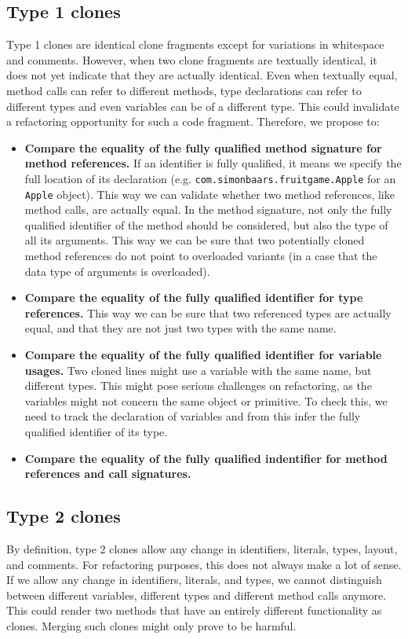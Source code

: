\documentclass[a4paper]{article}
\begin{document}
\subsection{Type 1 clones} \label{chap:type1clones}
Type 1 clones are identical clone fragments except for variations in whitespace and comments. However, when two clone fragments are textually identical, it does not yet indicate that they are actually identical. Even when textually equal, method calls can refer to different methods, type declarations can refer to different types and even variables can be of a different type. This could invalidate a refactoring opportunity for such a code fragment. Therefore, we propose to:
\begin{itemize}
  \item \textbf{Compare the equality of the fully qualified method signature for method references.} If an identifier is fully qualified, it means we specify the full location of its declaration (e.g. \texttt{com.simonbaars.fruitgame.Apple} for an \texttt{Apple} object). This way we can validate whether two method references, like method calls, are actually equal. In the method signature, not only the fully qualified identifier of the method should be considered, but also the type of all its arguments. This way we can be sure that two potentially cloned method references do not point to overloaded variants (in a case that the data type of arguments is overloaded).
  \item \textbf{Compare the equality of the fully qualified identifier for type references.} This way we can be sure that two referenced types are actually equal, and that they are not just two types with the same name.
  \item \textbf{Compare the equality of the fully qualified identifier for variable usages.} Two cloned lines might use a variable with the same name, but different types. This might pose serious challenges on refactoring, as the variables might not concern the same object or primitive. To check this, we need to track the declaration of variables and from this infer the fully qualified identifier of its type.
  \item \textbf{Compare the equality of the fully qualified indentifier for method references and call signatures.}
\end{itemize}

\subsection{Type 2 clones}
By definition, type 2 clones allow any change in identifiers, literals, types, layout, and comments. For refactoring purposes, this does not always make a lot of sense. If we allow any change in identifiers, literals, and types, we cannot distinguish between different variables, different types and different method calls anymore. This could render two methods that have an entirely different functionality as clones. Merging such clones might only prove to be harmful.
\end{document}
